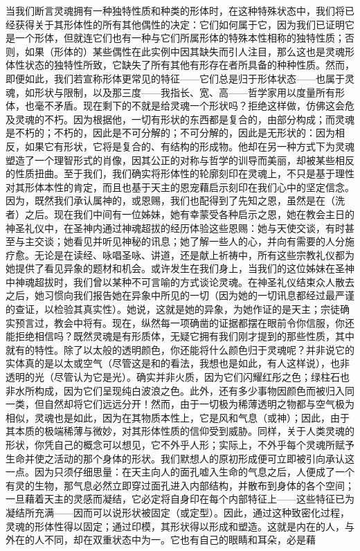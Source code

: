 当我们断言灵魂拥有一种独特性质和种类的形体时，在这种特殊状态中，我们将已经获得关于其形体性的所有其他偶性的决定：它们如何属于它，因为我们已证明它是一个形体，但就连它们也有一种与它们所属形体的特殊本性相称的独特性质；否则，如果（形体的）某些偶性在此实例中因其缺失而引人注目，那么这也是灵魂形体性状态的独特性所致，它缺失了所有其他有形存在者所具备的种种性质。然而，即便如此，我们若宣称形体更常见的特征——它们总是归于形体状态——也属于灵魂，如形状与限制，以及那三度——我指长、宽、高——哲学家用以度量所有形体，也毫不矛盾。现在剩下的不就是给灵魂一个形状吗？拒绝这样做，仿佛这会危及灵魂的不朽。因为根据他，一切有形状的东西都是复合的，由部分构成；而灵魂是不朽的；不朽的，因此是不可分解的；不可分解的，因此是无形状的：因为相反，如果它有形状，它将是复合的、有结构的形成物。他却在另一种方式下为灵魂塑造了一个理智形式的肖像，因其公正的对称与哲学的训导而美丽，却被某些相反的性质扭曲。至于我们，我们确实将形体性的轮廓刻印在灵魂上，不只是基于理性对其形体本性的肯定，而且也基于天主的恩宠藉启示刻印在我们心中的坚定信念。因为，既然我们承认属神的，或恩赐，我们也配得到了先知之恩，虽然是在（洗者）之后。现在我们中间有一位姊妹，她有幸蒙受各种启示之恩，她在教会主日的神圣礼仪中，在圣神内通过神魂超拔的经历体验这些恩赐：她与天使交谈，有时甚至与主交谈；她看见并听见神秘的讯息；她了解一些人的心，并向有需要的人分施疗愈。无论是在读经、咏唱圣咏、讲道，还是献上祈祷中，所有这些宗教礼仪都为她提供了看见异象的题材和机会。或许发生在我们身上，当我们的这位姊妹在圣神中神魂超拔时，我们曾以某种不可言喻的方式谈论灵魂。在神圣礼仪结束众人散去之后，她习惯向我们报告她在异象中所见的一切（因为她的一切讯息都经过最严谨的查证，以检验其真实性）。她说，这就是她的异象，为她作证的是天主；宗徒确实预言过，教会中将有。现在，纵然每一项确凿的证据都摆在眼前令你信服，你还能拒绝相信吗？既然灵魂是有形质体，无疑它拥有我们刚才提到的那些性质，其中就有的特性。除了以太般的透明颜色，你还能将什么颜色归于灵魂呢？并非说它的实体真的是以太或空气（尽管这是和的看法，我想也是如此，有人这样说），也非透明的光（尽管认为它是光）。确实并非火质，因为它们闪耀红彤之色；绿柱石也非水所构成，因为它们呈现纯白波浪之色。此外，还有多少事物因颜色而被归入同一类，但自然却将它们远远分开！然而，由于一切极为稀薄透明之物都与空气极为相似，灵魂也是如此，因为在其物质本性上，它是风和气息（或神）；因此，由于其本质的极端稀薄与微妙，对其形体性质的信仰受到威胁。同样，关于人类灵魂的形状，你凭自己的概念可以想见，它不外乎人形；实际上，不外乎每个灵魂所赋予生命并使之活动的那个身体的形状。我们默想人的原初形成便可立即被引向承认这一点。因为只须仔细思量：在天主向人的面孔嘘入生命的气息之后，人便成了一个有灵的生物，那气息必然立即穿过面孔进入内部结构，并散布到身体的各个空间；一旦藉着天主的灵感而凝结，它必定将自身印在每个内部特征上——这些特征已为凝结所充满——因而可以说形状被固定（或定型）。因此，通过这种致密化过程，灵魂的形体性得以固定；通过印模，其形状得以形成和塑造。这就是内在的人，与外在的人不同，却在双重状态中为一。它也有自己的眼睛和耳朵，必是藉